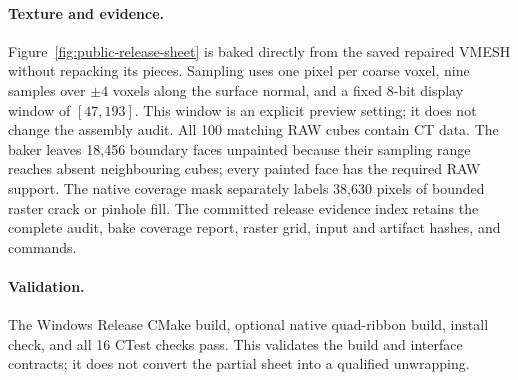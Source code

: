 \paragraph{Texture and evidence.}
Figure~\ref{fig:public-release-sheet} is baked directly from the saved
repaired VMESH without repacking its pieces. Sampling uses one pixel per
coarse voxel, nine samples over $\pm4$ voxels along the surface normal,
and a fixed 8-bit display window of $[47,193]$. This window is an explicit
preview setting; it does not change the assembly audit.
All 100 matching RAW cubes contain CT data. The baker leaves 18,456 boundary
faces unpainted because their sampling range reaches absent neighbouring
cubes; every painted face has the required RAW support. The native coverage
mask separately labels 38,630 pixels of bounded raster crack or pinhole fill.
The committed release evidence index retains the complete audit, bake
coverage report, raster grid, input and artifact hashes, and commands.

\paragraph{Validation.}
The Windows Release CMake build, optional native quad-ribbon build, install
check, and all 16 CTest checks pass. This validates the build and interface
contracts; it does not convert the partial sheet into a qualified unwrapping.
